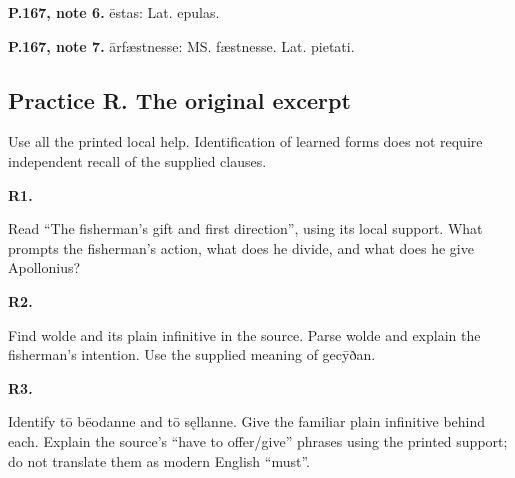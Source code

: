 \textbf{P.167, note 6.} ēstas: Lat. epulas.

\textbf{P.167, note 7.} ārfæstnesse: MS. fæstnesse. Lat. pietati.

\subsection*{Practice R. The original excerpt}

Use all the printed local help. Identification of learned forms does not require independent recall of the supplied clauses.

\par\begin{minipage}{\linewidth}\raggedright
\textbf{R1.}

Read “The fisherman’s gift and first direction”, using its local support. What prompts the fisherman’s action, what does he divide, and what does he give Apollonius?

\end{minipage}\par\addvspace{4pt}

\par\begin{minipage}{\linewidth}\raggedright
\textbf{R2.}

Find wolde and its plain infinitive in the source. Parse wolde and explain the fisherman’s intention. Use the supplied meaning of gecȳðan.

\end{minipage}\par\addvspace{4pt}

\par\begin{minipage}{\linewidth}\raggedright
\textbf{R3.}

Identify tō bēodanne and tō sęllanne. Give the familiar plain infinitive behind each. Explain the source’s “have to offer/\allowbreak{}give” phrases using the printed support; do not translate them as modern English “must”.

\end{minipage}\par\addvspace{4pt}

